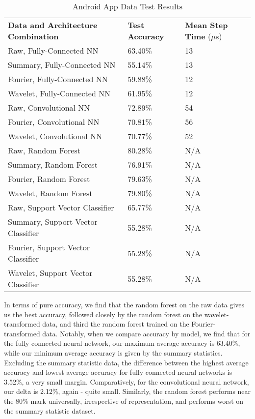 \begin{table}[h]
\caption{Android App Data Test Results}
\centering
\label{Tab:test}	
\begin{tabular}{l|ll}
\textbf{Data and Architecture Combination} & \textbf{Test Accuracy} & \textbf{Mean Step Time} ($\mu$s) \\\cline{1-3}
Raw, Fully-Connected NN            & 63.40\%         & 13\\
Summary, Fully-Connected NN        & 55.14\%         & 13\\
Fourier, Fully-Connected NN        & 59.88\%         & 12\\
Wavelet, Fully-Connected NN        & 61.95\%         & 12\\
\hline
Raw, Convolutional NN              & 72.89\%         & 54\\
Fourier, Convolutional NN          & 70.81\%         & 56\\
Wavelet, Convolutional NN          & 70.77\%         & 52\\
\hline
Raw, Random Forest                 & 80.28\%         & N/A\\ 
Summary, Random Forest             & 76.91\%         & N/A\\
Fourier, Random Forest             & 79.63\%         & N/A\\
Wavelet, Random Forest             & 79.80\%         & N/A\\
\hline
Raw, Support Vector Classifier     & 65.77\%         & N/A\\    
Summary, Support Vector Classifier & 55.28\%         & N/A\\  
Fourier, Support Vector Classifier & 55.28\%         & N/A\\  
Wavelet, Support Vector Classifier & 55.28\%         & N/A           
\end{tabular}
\end{table}

In terms of pure accuracy, we find that the random forest on the raw data gives us the best accuracy, followed closely by the random forest on the wavelet-transformed data, and third the random forest trained on the Fourier-transformed data. 
Notably, when we compare accuracy by model, we find that for the fully-connected neural network, our maximum average accuracy is 63.40\%, while our minimum average accuracy is given by the summary statistics.
Excluding the summary statistic data, the difference between the highest average accuracy and lowest average accuracy for fully-connected neural networks is 3.52\%, a very small margin. 
Comparatively, for the convolutional neural network, our delta is 2.12\%, again - quite small. 
Similarly, the random forest performs near the 80\% mark universally, irrespective of representation, and performs worst on the summary statistic dataset. 
